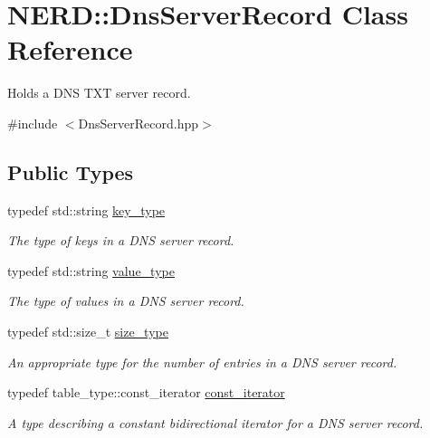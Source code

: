 \hypertarget{classNERD_1_1DnsServerRecord}{
\section{\-N\-E\-R\-D\-:\-:\-Dns\-Server\-Record \-Class \-Reference}
\label{classNERD_1_1DnsServerRecord}
}


\-Holds a \-D\-N\-S \-T\-X\-T server record.  




{\ttfamily \#include $<$\-Dns\-Server\-Record.\-hpp$>$}

\subsection*{\-Public \-Types}
\begin{DoxyCompactItemize}
\item 
typedef std\-::string \hyperlink{classNERD_1_1DnsServerRecord_ae4822fbc6f9564c337a67c40358e2810}{key\-\_\-type}
\begin{DoxyCompactList}\small\item\em \-The type of keys in a \-D\-N\-S server record. \end{DoxyCompactList}\item 
typedef std\-::string \hyperlink{classNERD_1_1DnsServerRecord_aec809b0a9732f03885f5df5dd56f5f52}{value\-\_\-type}
\begin{DoxyCompactList}\small\item\em \-The type of values in a \-D\-N\-S server record. \end{DoxyCompactList}\item 
typedef std\-::size\-\_\-t \hyperlink{classNERD_1_1DnsServerRecord_a51602195a3768bfdac0b69fb76358167}{size\-\_\-type}
\begin{DoxyCompactList}\small\item\em \-An appropriate type for the number of entries in a \-D\-N\-S server record. \end{DoxyCompactList}\item 
typedef table\-\_\-type\-::const\-\_\-iterator \hyperlink{classNERD_1_1DnsServerRecord_a870208456774471b644a9715f88d4ea6}{const\-\_\-iterator}
\begin{DoxyCompactList}\small\item\em \-A type describing a constant bidirectional iterator for a \-D\-N\-S server record. \end{DoxyCompactList}\end{DoxyCompactItemize}
